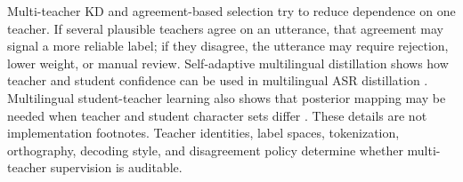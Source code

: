 \documentclass[pdflatex,sn-basic,iicol]{sn-jnl}
\theoremstyle{thmstyleone}
\theoremstyle{thmstyletwo}
\theoremstyle{thmstylethree}
\begin{document}
Multi-teacher KD and agreement-based selection try to reduce dependence on one teacher. If several plausible teachers agree on an utterance, that agreement may signal a more reliable label; if they disagree, the utterance may require rejection, lower weight, or manual review. Self-adaptive multilingual distillation shows how teacher and student confidence can be used in multilingual ASR distillation \citep{leal21_interspeech}. Multilingual student-teacher learning also shows that posterior mapping may be needed when teacher and student character sets differ \citep{farooq2023must}. These details are not implementation footnotes. Teacher identities, label spaces, tokenization, orthography, decoding style, and disagreement policy determine whether multi-teacher supervision is auditable.

\end{document}
